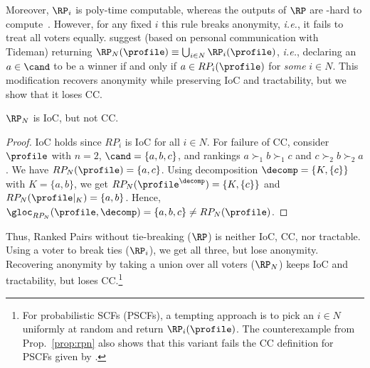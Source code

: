 Moreover, $\RP_i$ is poly-time computable, whereas the outputs of $\RP$ are \NP-hard to compute~\citep{Brill12:Price}. However, for any fixed $i$ this rule breaks anonymity, \emph{i.e.}, it fails to treat all voters equally.  \citet{Holliday23:Split} suggest (based on personal communication with Tideman) returning 
$\RP_N(\profile) \equiv \bigcup_{i \in N} \RP_i(\profile)$, \emph{i.e.}, 
declaring an $a \in \cand$ to be a winner if and only if $a \in RP_i(\profile)$ for \emph{some} $i \in N$.  This modification recovers anonymity while preserving IoC and tractability, but we show that it loses CC.
\begin{proposition}\label{prop:rpn}
    $\RP_N$ is IoC, but not CC.
\end{proposition}
\begin{proof}
    IoC holds since $RP_i$ is IoC for all $i \in N$. For failure of CC, consider $\profile$ with $n=2$, $\cand=\{a,b,c\}$, and rankings $a \succ_1 b \succ_1 c$ and  $c \succ_2 b \succ_2 a$. We have $RP_N(\profile)=\{a,c\}$. Using decomposition $\decomp=\{K, \{c\}\}$ with $K=\{a,b\}$, we get $RP_N(\profile^\decomp)=\{K, \{c\}\}$ and $RP_N(\profile|_K)=\{a,b\}$. Hence, $\gloc_{RP_N}(\profile, \decomp)= \{a,b,c\} \neq RP_N(\profile)$.
\end{proof}

Thus, Ranked Pairs without tie-breaking ($\RP$) is neither IoC, CC, nor tractable. Using a voter to break ties ($\RP_i$), we get all three, but lose anonymity. Recovering anonymity by taking a union over all voters ($\RP_N$) keeps IoC and tractability, but loses CC.\footnote{For probabilistic SCFs (PSCFs), a tempting approach is to pick an $i\in N$ uniformly at random and return $\RP_{i}(\profile)$. The counterexample from Prop.~\ref{prop:rpn} also shows that this variant fails the CC definition for PSCFs given by \citet{Brandl16:Consistent}.}  

\usetikzlibrary{backgrounds}

